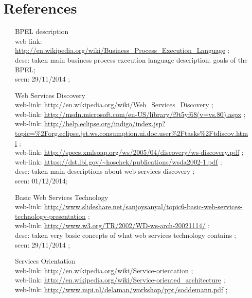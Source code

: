 \section{References}
\par{
\begin{enumerate}
\item [BPEL description] \\ web-link: \url{http://en.wikipedia.org/wiki/Business_Process_Execution_Language} ; \\ desc: taken main business process execution language description; goals of the BPEL; \\ seen: 29/11/2014 ; \\ 
\item [Web Services Discovery] \\ web-link: \url{http://en.wikipedia.org/wiki/Web_Services_Discovery} ; \\ 
web-link: \url{http://msdn.microsoft.com/en-US/library/f9t5yf68(v=vs.80).aspx} ; \\
web-link: \url{http://help.eclipse.org/indigo/index.jsp?topic=%2Forg.eclipse.jst.ws.consumption.ui.doc.user%2Ftasks%2Ftdiscov.html} ; \\ 
web-link: \url{http://specs.xmlsoap.org/ws/2005/04/discovery/ws-discovery.pdf} ; \\
web-link: \url{https://dst.lbl.gov/~hoschek/publications/wsda2002-1.pdf} ; \\
desc: taken main descriptions about web services discovery ; \\ seen: 01/12/2014; \\
\item [Basic Web Services Technology] \\ web-link: \url{http://www.slideshare.net/sanjoysanyal/topic6-basic-web-services-technology-presentation} ; \\ 
web-link: \url{http://www.w3.org/TR/2002/WD-ws-arch-20021114/} ; \\ desc: taken very basic concepts of what web services technology contains ; \\ seen: 29/11/2014 ; \\
\item [Services Orientation] \\ web-link: \url{http://en.wikipedia.org/wiki/Service-orientation} ; \\ 
web-link: \url{http://en.wikipedia.org/wiki/Service-oriented_architecture} ; \\ 
web-link: \url{http://www.mpi.nl/delaman/workshop/ppt/soddemann.pdf} ; \\ 

\end{enumerate}}
